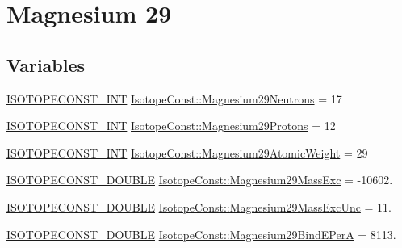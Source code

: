 \hypertarget{group___isotope_const-_magnesium-_mg29}{}\section{Magnesium 29}
\label{group___isotope_const-_magnesium-_mg29}
\subsection*{Variables}
\begin{DoxyCompactItemize}
\item 
\mbox{\hyperlink{group___isotope_const-_macros_ga5f18360b3e99483a35c32d789e62621c}{I\+S\+O\+T\+O\+P\+E\+C\+O\+N\+S\+T\+\_\+\+I\+NT}} \mbox{\hyperlink{group___isotope_const-_magnesium-_mg29_gaec6b3b29f1dfc8eb828d83924699e3ef}{Isotope\+Const\+::\+Magnesium29\+Neutrons}} = 17
\item 
\mbox{\hyperlink{group___isotope_const-_macros_ga5f18360b3e99483a35c32d789e62621c}{I\+S\+O\+T\+O\+P\+E\+C\+O\+N\+S\+T\+\_\+\+I\+NT}} \mbox{\hyperlink{group___isotope_const-_magnesium-_mg29_gab578b50edf140a16df6a337fd8ad60c1}{Isotope\+Const\+::\+Magnesium29\+Protons}} = 12
\item 
\mbox{\hyperlink{group___isotope_const-_macros_ga5f18360b3e99483a35c32d789e62621c}{I\+S\+O\+T\+O\+P\+E\+C\+O\+N\+S\+T\+\_\+\+I\+NT}} \mbox{\hyperlink{group___isotope_const-_magnesium-_mg29_ga350865d9d217e4dd98a825457e3f3d15}{Isotope\+Const\+::\+Magnesium29\+Atomic\+Weight}} = 29
\item 
\mbox{\hyperlink{group___isotope_const-_macros_ga8f45a7272ce02c0b4c65c44636ed719a}{I\+S\+O\+T\+O\+P\+E\+C\+O\+N\+S\+T\+\_\+\+D\+O\+U\+B\+LE}} \mbox{\hyperlink{group___isotope_const-_magnesium-_mg29_gaee7e71cfcddcaea6dee95f86add3f9f3}{Isotope\+Const\+::\+Magnesium29\+Mass\+Exc}} = -\/10602.
\item 
\mbox{\hyperlink{group___isotope_const-_macros_ga8f45a7272ce02c0b4c65c44636ed719a}{I\+S\+O\+T\+O\+P\+E\+C\+O\+N\+S\+T\+\_\+\+D\+O\+U\+B\+LE}} \mbox{\hyperlink{group___isotope_const-_magnesium-_mg29_ga6babb55dde5781800ac204c102d602b4}{Isotope\+Const\+::\+Magnesium29\+Mass\+Exc\+Unc}} = 11.
\item 
\mbox{\hyperlink{group___isotope_const-_macros_ga8f45a7272ce02c0b4c65c44636ed719a}{I\+S\+O\+T\+O\+P\+E\+C\+O\+N\+S\+T\+\_\+\+D\+O\+U\+B\+LE}} \mbox{\hyperlink{group___isotope_const-_magnesium-_mg29_ga3f26d33dfe801ba90cdd730f97cf6714}{Isotope\+Const\+::\+Magnesium29\+Bind\+E\+PerA}} = 8113.
\item 

\end{DoxyCompactItemize}
